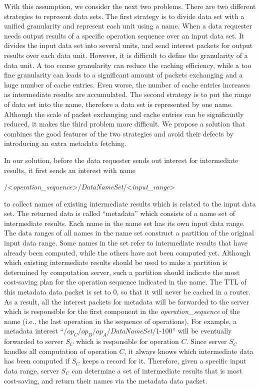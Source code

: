 With this assumption, we consider the next two problems.  
There are two different strategies to represent data sets.  
The first strategy is to divide data set with a unified granularity and represent each unit using a name.  
When a data requester needs output results of a specific operation sequence over an input data set.  
It divides the input data set into several units, and send {\sc interest} packets for output results over each data unit.  
However, it is difficult to define the granularity of a data unit.  
A too coarse granularity can reduce the caching efficiency, while a too fine granularity can leads to a significant amount of packets exchanging and a huge number of cache entries.
Even worse, the number of cache entries increases as intermediate results are accumulated.  
The second strategy is to put the range of data set into the name, therefore a data set is represented by one name.  
Although the scale of packet exchanging and cache entries can be significantly reduced, it makes the third problem more difficult.  
We propose a solution that combines the good features of the two strategies and avoid their defects by introducing an extra metadata fetching.

In our solution, before the data requester sends out {\sc interest} for intermediate results, it first sends an {\sc interest} with name 
\begin{center}
/\textless{\it operation\_sequence}\textgreater/{\it DataNameSet}/\textless{\it input\_range}\textgreater
\end{center}
to collect names of existing intermediate results which is related to the input data set.  
The returned {\sc data} is called ``metadata'' which consists of a name set of intermediate results. 
Each name in the name set has its own input data range.
The data ranges of all names in the name set construct a partition of the original input data range.
Some names in the set refer to intermediate results that have already been computed, while the others have not been computed yet.
Although which existing intermediate results should be used to make a partition is determined by computation server,
such a partition should indicate the most cost-saving plan for the operation sequence indicated in the name.  
The TTL of this metadata {\sc data} packet is set to 0, so that it will never be cached in a router.  
As a result, all the {\sc interest} packets for metadata will be forwarded to the server which is responsible for the first component in the {\it operation\_sequence} of the name (i.e., the last operation in the sequence of operations).  
For example, a metadata {\sc interest} ``/$op_C$/$op_B$/$op_A$/{\it DataNameSet}/1-100'' will be eventually forwarded to server $S_C$ which is responsible for operation $C$.  
Since server $S_C$ handles all computation of operation $C$, it always knows which intermediate data has been computed if $S_C$ keeps a record for it.  
Therefore, given a specific input data range, server $S_C$ can determine a set of intermediate results that is most cost-saving, and return their names via the metadata {\sc data} packet.

